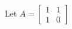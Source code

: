 \documentclass[preview]{standalone}
\begin{document}
\begin{center}
Let $A =  \begin{bmatrix} 1 & 1 \\ 1 & 0 \end{bmatrix}$
\end{center}
\end{document}
